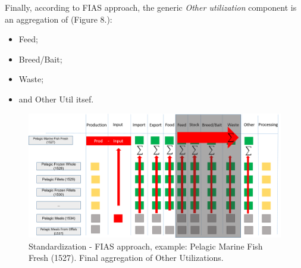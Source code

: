 \documentclass[nojss]{jss}
\begin{document}
Finally, according to FIAS approach, the generic \textit{Other utilization} component is an aggregation of (Figure 8.):

\begin{itemize}
\item Feed;
\item Breed/Bait;
\item Waste;
\item and Other Util itsef.
\end{itemize}


\begin{center}
\begin{figure}
\includegraphics{flow-charts/standardization/FIAS_standardization2.png}
\caption{Standardization - FIAS approach, example: Pelagic Marine Fish Fresh  (1527). Final aggregation of Other Utilizations.}
\end{figure}
\end{center}
\end{document}
